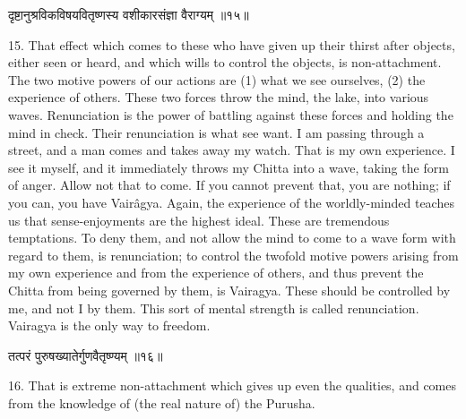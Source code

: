 \begin{center}
\begin{sanskrit}
दृष्टानुश्रविकविषयवितृष्णस्य वशीकारसंज्ञा
वैराग्यम् ॥१५॥
\end{sanskrit}
\end{center}
15. That effect which comes to these who have given up their
thirst after objects, either seen or heard, and which wills to control
the objects, is non-attachment. \\

The two motive powers of our actions are (1) what we see
ourselves, (2) the experience of others. These two
forces throw the mind, the lake, into various waves. Renunciation is
the power of battling against these forces and holding the mind in
check. Their renunciation is what see want. I am passing through a
street, and a man comes and takes away my watch. That is my own
experience. I see it myself, and it immediately throws my Chitta into a
wave, taking the form of anger. Allow not that to come. If you cannot
prevent that, you are nothing; if you can, you have Vairâgya. Again,
the experience of the worldly-minded teaches us that sense-enjoyments
are the highest ideal. These are tremendous temptations. To deny them,
and not allow the mind to come to a wave form with regard to them, is
renunciation; to control the twofold motive powers arising from my own
experience and from the experience of others, and thus prevent the
Chitta from being governed by them, is Vairagya. These should be
controlled by me, and not I by them. This sort of mental strength is
called renunciation. Vairagya is the only way to freedom. \\

\begin{center}
\begin{sanskrit}
तत्परं पुरुषख्यातेर्गुणवैतृष्ण्यम् ॥१६॥
\end{sanskrit}
\end{center}
16. That is extreme non-attachment which gives up even the
qualities, and comes from the knowledge of (the real nature of) the
Purusha. \\

